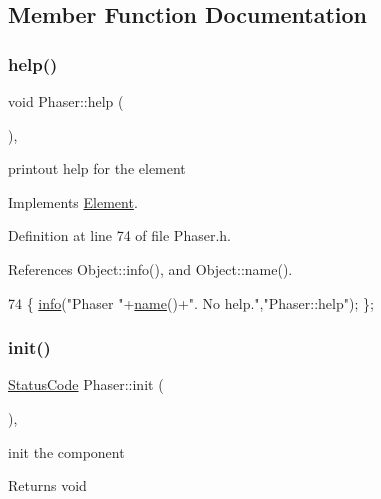 \subsection{Member Function Documentation}
\mbox{\label{classPhaser_a0f122559297d076500420a7ceb21d70d}} 
\subsubsection{\texorpdfstring{help()}{help()}}
{\footnotesize\ttfamily void Phaser\+::help (\begin{DoxyParamCaption}{ }\end{DoxyParamCaption})\hspace{0.3cm}{\ttfamily [inline]}, {\ttfamily [virtual]}}

printout help for the element 

Implements \hyperlink{classElement_a32c0de27acb08e17251cef88c3e9303a}{Element}.



Definition at line 74 of file Phaser.\+h.



References Object\+::info(), and Object\+::name().


\begin{DoxyCode}
74 \{ \hyperlink{classObject_a644fd329ea4cb85f54fa6846484b84a8}{info}(\textcolor{stringliteral}{"Phaser "}+\hyperlink{classObject_a300f4c05dd468c7bb8b3c968868443c1}{name}()+\textcolor{stringliteral}{". No help."},\textcolor{stringliteral}{"Phaser::help"}); \};
\end{DoxyCode}
\mbox{\label{classPhaser_a4691b8963a099f8a75475eb9be47a309}} 
\subsubsection{\texorpdfstring{init()}{init()}}
{\footnotesize\ttfamily \hyperlink{classStatusCode}{Status\+Code} Phaser\+::init (\begin{DoxyParamCaption}{ }\end{DoxyParamCaption})\hspace{0.3cm}{\ttfamily [inline]}, {\ttfamily [virtual]}}

init the component

\begin{DoxyReturn}{Returns}
void 
\end{DoxyReturn}


